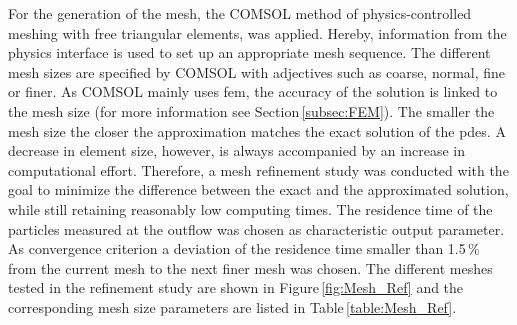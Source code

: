 \begin{figure}
\centering
{}
\end{figure}
\FloatBarrier
For the generation of the mesh, the COMSOL method of physics-controlled meshing with free triangular elements, was applied. Hereby, information from the physics interface is used to set up an appropriate mesh sequence. The different mesh sizes are specified by COMSOL with adjectives such as coarse, normal, fine or finer. As COMSOL mainly uses \gls{fem}, the accuracy of the solution is linked to the mesh size (for more information see Section\,\ref{subsec:FEM}). The smaller the mesh size the closer the approximation matches the exact solution of the \glspl{pde}. A decrease in element size, however, is always accompanied by an increase in computational effort. Therefore, a mesh refinement study was conducted with the goal to minimize the difference between the exact and the approximated solution, while still retaining reasonably low computing times. The residence time of the particles measured at the outflow was chosen as characteristic output parameter. As convergence criterion a deviation of the residence time smaller than 1.5\,\% from the current mesh to the next finer mesh was chosen. The different meshes tested in the refinement study are shown in Figure\,\ref{fig:Mesh_Ref} and the corresponding mesh size parameters are listed in Table\,\ref{table:Mesh_Ref}.  

